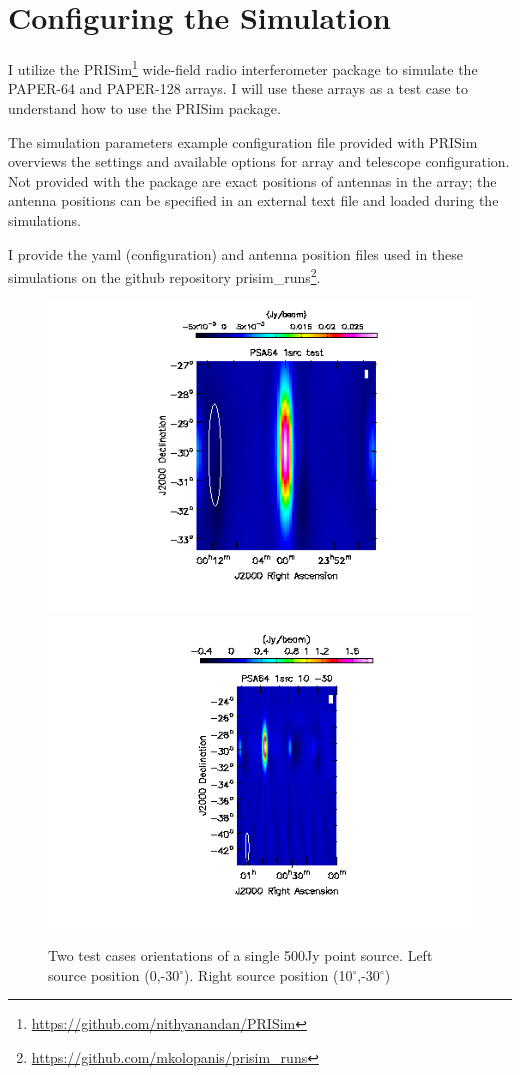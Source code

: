 \documentclass[hidelinks]{article}
\newcommand{\degree}{$^{\circ}$}
\begin{document}
\section{Configuring the Simulation}{
I utilize the PRISim\footnote{\url{https://github.com/nithyanandan/PRISim}} wide-field radio interferometer package to simulate the PAPER-64 and PAPER-128 arrays. I will use these arrays as a test case to understand how to use the PRISim package.


The simulation parameters example configuration file provided with PRISim overviews the settings and available options for array and telescope configuration. Not provided with the package are exact positions of antennas in the array; the antenna positions can be specified in an external text file and loaded during the simulations.

I provide the yaml (configuration) and antenna position files used in these simulations on the github repository prisim\_runs\footnote{\url{https://github.com/mkolopanis/prisim_runs}}.
}
\begin{figure}[t]
\centering
\includegraphics[width=.45\textwidth]{psa64_1src_test.png}
\includegraphics[width=.45\textwidth]{psa64_1src_10_-30.png}
\caption{Two test cases orientations of a single 500Jy point source. Left source position (0,-30\degree). Right source position (10\degree ,-30\degree)\label{fig:psa64_1src}}
\end{figure}
\end{document}
